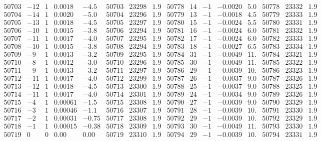 \documentclass[11pt,reqno,a4letter]{article}
\numberwithin{figure}{section}
\numberwithin{table}{section}
\theoremstyle{plain}
\numberwithin{theorem}{section}
\theoremstyle{definition}
\begin{document}
\begin{table}[ht]
\begin{equation*}
{\begin{array}{ccccc|ccc||ccccc|ccc}
50703 & -12 & 1 & 0.0018 & -4.5 & 50703 & 23298 & 1.9 & 50778 & 14 & -1 & -0.0020 & 5.0 & 50778 & 23332 & 1.9  \\
50704 & -14 & 1 & 0.0020 & -5.0 & 50704 & 23296 & 1.9 & 50779 & 13 & -1 & -0.0018 & 4.5 & 50779 & 23333 & 1.9  \\
50705 & -13 & 1 & 0.0018 & -4.5 & 50705 & 23297 & 1.9 & 50780 & 15 & -1 & -0.0024 & 5.5 & 50780 & 23331 & 1.9  \\
50706 & -10 & 1 & 0.0015 & -3.8 & 50706 & 23294 & 1.9 & 50781 & 16 & -1 & -0.0024 & 6.0 & 50781 & 23332 & 1.9  \\
50707 & -11 & 1 & 0.0017 & -4.0 & 50707 & 23295 & 1.9 & 50782 & 17 & -1 & -0.0024 & 6.0 & 50782 & 23333 & 1.9  \\
50708 & -10 & 1 & 0.0015 & -3.8 & 50708 & 23294 & 1.9 & 50783 & 18 & -1 & -0.0027 & 6.5 & 50783 & 23334 & 1.9  \\
50709 & -9 & 1 & 0.0013 & -3.2 & 50709 & 23295 & 1.9 & 50784 & 31 & -1 & -0.0049 & 11. & 50784 & 23321 & 1.9  \\
50710 & -8 & 1 & 0.0012 & -3.0 & 50710 & 23296 & 1.9 & 50785 & 30 & -1 & -0.0049 & 11. & 50785 & 23322 & 1.9  \\
50711 & -9 & 1 & 0.0013 & -3.2 & 50711 & 23297 & 1.9 & 50786 & 29 & -1 & -0.0039 & 10. & 50786 & 23323 & 1.9  \\
50712 & -11 & 1 & 0.0017 & -4.0 & 50712 & 23299 & 1.9 & 50787 & 26 & -1 & -0.0037 & 9.0 & 50787 & 23326 & 1.9  \\
50713 & -12 & 1 & 0.0018 & -4.5 & 50713 & 23300 & 1.9 & 50788 & 25 & -1 & -0.0037 & 9.0 & 50788 & 23325 & 1.9  \\
50714 & -11 & 1 & 0.0017 & -4.0 & 50714 & 23301 & 1.9 & 50789 & 24 & -1 & -0.0034 & 9.0 & 50789 & 23326 & 1.9  \\
50715 & -4 & 1 & 0.00061 & -1.5 & 50715 & 23308 & 1.9 & 50790 & 27 & -1 & -0.0039 & 9.0 & 50790 & 23329 & 1.9  \\
50716 & -3 & 1 & 0.00046 & -1.1 & 50716 & 23307 & 1.9 & 50791 & 28 & -1 & -0.0039 & 10. & 50791 & 23330 & 1.9  \\
50717 & -2 & 1 & 0.00031 & -0.75 & 50717 & 23308 & 1.9 & 50792 & 29 & -1 & -0.0039 & 10. & 50792 & 23329 & 1.9  \\
50718 & -1 & 1 & 0.00015 & -0.38 & 50718 & 23309 & 1.9 & 50793 & 30 & -1 & -0.0049 & 11. & 50793 & 23330 & 1.9  \\
50719 & 0 & 0 & 0.00 & 0.00 & 50719 & 23310 & 1.9 & 50794 & 29 & -1 & -0.0039 & 10. & 50794 & 23331 & 1.9  \\

\end{array}}
\end{equation*}
\end{table}
\end{document}
